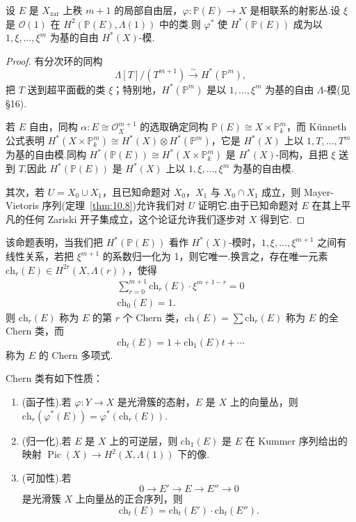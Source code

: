 \begin{theorem}\label{thm:23.2}
设 $E$ 是 $X_{\mathrm{zar}}$ 上秩 $m + 1$ 的局部自由层，$\varphi \colon \mathbb{P}(E) \to X$ 是相联系的射影丛.设 $\xi$ 是 $\mathcal{O}(1)$ 在 $H^{2}(\mathbb{P}(E), \Lambda(1))$ 中的类.则 $\varphi^{*}$ 使 $H^{*}(\mathbb{P}(E))$ 成为以 $1, \xi, \ldots, \xi^{m}$ 为基的自由 $H^{*}(X)$-模.
\end{theorem}

\begin{proof}
有分次环的同构
\[
\Lambda[T]/(T^{m+1}) \xrightarrow{\sim} H^{*}(\mathbb{P}^{m}),
\]
把 $T$ 送到超平面截的类 $\xi$；特别地，$H^{*}(\mathbb{P}^{m})$ 是以 $1, \ldots, \xi^{m}$ 为基的自由 $\Lambda$-模(见 \S 16).

若 $E$ 自由，同构 $\alpha \colon E \cong \mathcal{O}^{m+1}_{X}$ 的选取确定同构 $\mathbb{P}(E) \cong X \times \mathbb{P}^{m}_{k}$，而 K\"unneth 公式表明 $H^{*}(X \times \mathbb{P}^{m}_{k}) \cong H^{*}(X) \otimes H^{*}(\mathbb{P}^{m})$，它是 $H^{*}(X)$ 上以 $1, T, \ldots, T^{m}$ 为基的自由模.同构 $H^{*}(\mathbb{P}(E)) \cong H^{*}(X \times \mathbb{P}^{m}_{k})$ 是 $H^{*}(X)$-同构，且把 $\xi$ 送到 $T$.因此 $H^{*}(\mathbb{P}(E))$ 是 $H^{*}(X)$ 上以 $1, \xi, \ldots, \xi^{m}$ 为基的自由模.

其次，若 $U = X_0 \cup X_1$，且已知命题对 $X_0$，$X_1$ 与 $X_0 \cap X_1$ 成立，则 Mayer-Vietoris 序列(定理~\ref{thm:10.8})允许我们对 $U$ 证明它.由于已知命题对 $E$ 在其上平凡的任何 Zariski 开子集成立，这个论证允许我们逐步对 $X$ 得到它.
\end{proof}

该命题表明，当我们把 $H^{*}(\mathbb{P}(E))$ 看作 $H^{*}(X)$-模时，$1, \xi, \ldots, \xi^{m+1}$ 之间有线性关系，若把 $\xi^{m+1}$ 的系数归一化为 1，则它唯一.换言之，存在唯一元素 $\mathrm{ch}_r(E) \in H^{2r}(X, \Lambda(r))$，使得
\[
\begin{array}{c}
\sum_{r=0}^{m+1} \mathrm{ch}_r(E) \cdot \xi^{m+1-r} = 0\\
\mathrm{ch}_0(E) = 1.
\end{array}
\]
则 $\mathrm{ch}_r(E)$ 称为 $E$ 的第 $r$ 个 Chern 类，$\mathrm{ch}(E) = \sum \mathrm{ch}_r(E)$ 称为 $E$ 的全 Chern 类，而
\[
\mathrm{ch}_t(E) = 1 + \mathrm{ch}_1(E)t + \cdots
\]
称为 $E$ 的 Chern 多项式.

\begin{theorem}\label{thm:23.3}
Chern 类有如下性质：
\begin{enumerate}
  \item (函子性).若 $\varphi \colon Y \to X$ 是光滑簇的态射，$E$ 是 $X$ 上的向量丛，则 $\mathrm{ch}_r(\varphi^{*}(E)) = \varphi^{*}(\mathrm{ch}_r(E))$.
  \item (归一化).若 $E$ 是 $X$ 上的可逆层，则 $\mathrm{ch}_1(E)$ 是 $E$ 在 Kummer 序列给出的映射 $\operatorname{Pic}(X) \to H^{2}(X, \Lambda(1))$ 下的像.
  \item (可加性).若
  \[
  0 \to E' \to E \to E'' \to 0
  \]
  是光滑簇 $X$ 上向量丛的正合序列，则
  \[
  \mathrm{ch}_t(E) = \mathrm{ch}_t(E') \cdot \mathrm{ch}_t(E'').
  \]
\end{enumerate}
\end{theorem}

